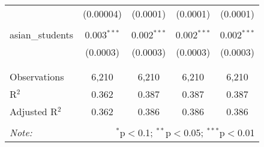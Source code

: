 \begin{table}[!htbp]
\begin{tabular}{@{\extracolsep{-2pt}}lcccc}
  & (0.00004) & (0.0001) & (0.0001) & (0.0001) \\ 
  & & & & \\ 
 asian\_students & 0.003$^{***}$ & 0.002$^{***}$ & 0.002$^{***}$ & 0.002$^{***}$ \\ 
  & (0.0003) & (0.0003) & (0.0003) & (0.0003) \\ 
  & & & & \\ 
\hline \\[-1.8ex] 
Observations & 6,210 & 6,210 & 6,210 & 6,210 \\ 
R$^{2}$ & 0.362 & 0.387 & 0.387 & 0.387 \\ 
Adjusted R$^{2}$ & 0.362 & 0.386 & 0.386 & 0.386 \\ 
\hline 
\hline \\[-1.8ex] 
\textit{Note:}  & \multicolumn{4}{r}{$^{*}$p$<$0.1; $^{**}$p$<$0.05; $^{***}$p$<$0.01} \\ 
\end{tabular} 
\end{table} 
